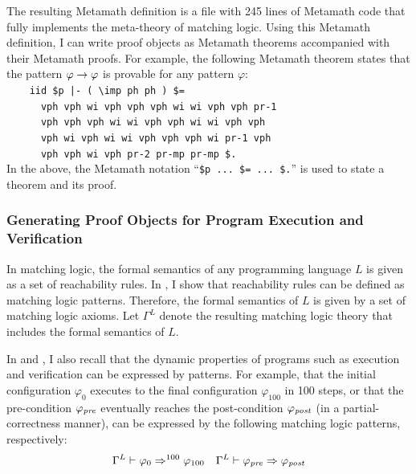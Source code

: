 \documentclass[11pt]{article}
\begin{document}
The resulting Metamath definition is a file \mlmm with 245 lines of Metamath 
code that fully implements the meta-theory of matching logic. 
Using this Metamath definition, 
I can write proof objects as Metamath theorems accompanied with their Metamath
proofs. 
For example, the following Metamath theorem states
that the pattern $\varphi \to \varphi$ is provable for any pattern $\varphi$:\\
\verb|    |\verb#iid $p |- ( \imp ph ph ) $=# \\
\verb|    |\verb#  vph vph wi vph vph vph wi wi vph vph pr-1 # \\
\verb|    |\verb#  vph vph vph wi wi vph vph wi wi vph vph # \\
\verb|    |\verb#  vph wi vph wi wi vph vph vph wi pr-1 vph # \\
\verb|    |\verb#  vph vph wi vph pr-2 pr-mp pr-mp $.# \\
In the above, the Metamath notation ``\verb|$p ... $= ... $.|'' is used to 
state a theorem and its proof. 


\subsubsection{Generating Proof Objects for Program Execution and Verification}

In matching logic, the formal semantics of any programming language $L$ 
is given as a set of reachability rules.
In , I show that reachability rules can be defined as matching logic patterns. 
Therefore, the formal semantics of $L$ is given by a set of matching logic axioms. 
Let $\Gamma^L$ denote the resulting matching logic theory that includes the formal semantics of $L$. 

In  and \cite{CR19},
I also recall that the dynamic properties of programs such as execution and verification can be expressed by patterns. 
For example, that the initial configuration $\varphi_0$ executes to the final configuration $\varphi_{100}$ in 100 steps,
or that the pre-condition $\varphi_\mathit{pre}$ eventually reaches the post-condition
$\varphi_\mathit{post}$ (in a partial-correctness manner), can be expressed by the following matching logic patterns, respectively:
\begin{align*}
& \Gamma^L \vdash \varphi_0 \Rightarrow^{100} \varphi_{100} &
\Gamma^L \vdash \varphi_\mathit{pre} \Rightarrow \varphi_\mathit{post}
\end{align*}
\end{document}
